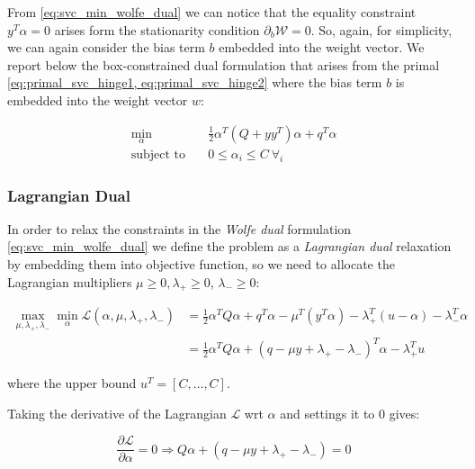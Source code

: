 From \ref{eq:svc_min_wolfe_dual} we can notice that the equality constraint $y^T \alpha = 0$ arises form the stationarity condition $\partial_{{b}} \mathcal{W}=0$. So, again, for simplicity, we can again consider the bias term $b$ embedded into the weight vector. We report below the box-constrained dual formulation \cite{hsu2002simple} that arises from the primal \ref{eq:primal_svc_hinge1, eq:primal_svc_hinge2} where the bias term $b$ is embedded into the weight vector $w$:

\begin{equation} \label{eq:svc_min_bcqp_wolf_dual}
    \begin{aligned}
        \min_{\alpha} \quad & \frac{1}{2} \alpha^T (Q + yy^T)\alpha+q^T\alpha \\
            \textrm{subject to} \quad & 0\leq\alpha_i\leq C \ \forall_i
    \end{aligned}
\end{equation}

\subsubsection{Lagrangian Dual}

In order to relax the constraints in the \emph{Wolfe dual} formulation \ref{eq:svc_min_wolfe_dual} we define the problem as a \emph{Lagrangian dual} relaxation by embedding them into objective function, so we need to allocate the Lagrangian multipliers $\mu \geq 0, \lambda_+ \geq 0$, $\lambda_- \geq 0$:

\begin{equation} \label{eq:svc_lagrangian_dual}
	\begin{aligned}
		    \max_{\mu,\lambda_+,\lambda_-} \min_{\alpha} \mathcal{L}(\alpha,\mu,\lambda_+,\lambda_-) &= \frac{1}{2} \alpha^T Q\alpha+q^T\alpha - \mu^T (y^T \alpha) - \lambda_+^T (u - \alpha) - \lambda_-^T \alpha \\
    &= \frac{1}{2} \alpha^T Q\alpha + (q - \mu y + \lambda_+ - \lambda_-)^T \alpha - \lambda_+^T u
	\end{aligned}
\end{equation}

where the upper bound $u^T = [C, \dots, C]$.

Taking the derivative of the Lagrangian $\mathcal{L}$ wrt $\alpha$ and settings it to 0 gives:

\begin{equation} \label{eq:svc_lagrangian_der_a}
	\frac{\partial \mathcal{L}}{\partial \alpha}=0\Rightarrow Q \alpha + (q - \mu y + \lambda_+ - \lambda_-) = 0
\end{equation}

